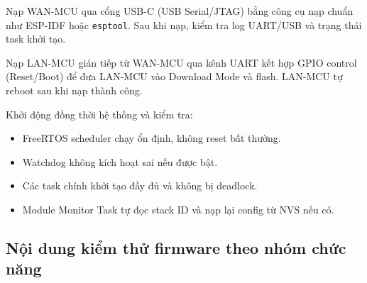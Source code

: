         Nạp WAN-MCU qua cổng USB-C (USB Serial/JTAG) bằng công cụ nạp chuẩn như ESP-IDF hoặc \texttt{esptool}. Sau khi nạp, kiểm tra log UART/USB và trạng thái task khởi tạo.

        Nạp LAN-MCU gián tiếp từ WAN-MCU qua kênh UART kết hợp GPIO control (Reset/Boot) để đưa LAN-MCU vào Download Mode và flash. LAN-MCU tự reboot sau khi nạp thành công.

        Khởi động đồng thời hệ thống và kiểm tra:
        \begin{itemize}
            \item FreeRTOS scheduler chạy ổn định, không reset bất thường.
            \item Watchdog không kích hoạt sai nếu được bật.
            \item Các task chính khởi tạo đầy đủ và không bị deadlock.
            \item Module Monitor Task tự đọc stack ID và nạp lại config từ NVS nếu có.
        \end{itemize}

    \subsection{Nội dung kiểm thử firmware theo nhóm chức năng}

